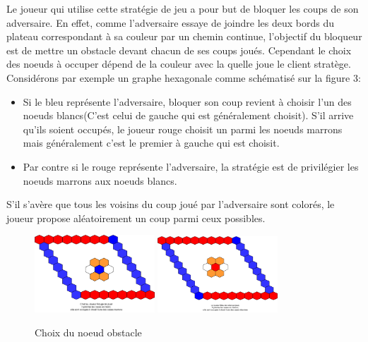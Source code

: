 Le joueur qui utilise cette stratégie de jeu a pour but de bloquer les coups de son adversaire. En effet, comme l'adversaire essaye de joindre les deux bords du plateau correspondant à sa couleur par un chemin continue, l'objectif du bloqueur est de mettre un obstacle devant chacun de ses coups joués.
Cependant le choix des noeuds à occuper dépend de la couleur avec la quelle joue le client stratège.
Considérons par exemple un graphe hexagonale comme schématisé sur la figure 3:
\begin{itemize}
    \item Si le bleu représente l'adversaire, bloquer son coup revient à choisir l'un des noeuds blancs(C'est celui de gauche qui est généralement choisit). S'il arrive qu'ils soient occupés, le joueur rouge choisit un parmi les noeuds marrons mais généralement c'est le premier à gauche qui est choisit.
    
    \item Par contre si le rouge représente l'adversaire, la stratégie est de privilégier les noeuds marrons aux noeuds blancs.
\end{itemize}
S'il s'avère que tous les voisins du coup joué par l'adversaire sont colorés, le joueur propose aléatoirement un coup parmi ceux possibles.
\begin{figure}[h]
    \centering
    \label{fig:coupbloqueur}
    \includegraphics[width=0.4\textwidth]{Images/rouge.png}
    \includegraphics[width=0.4\textwidth]{Images/bleue.png}
    \caption{Choix du noeud obstacle}
\end{figure}

